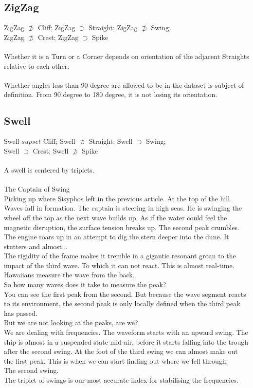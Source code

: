 \documentclass{report}
\begin{document}
\subsection{ZigZag}
ZigZag $\not\supset$ Cliff; ZigZag $\supset$ Straight; ZigZag $\not\supset$ Swing;\\ ZigZag $\not\supset$ Crest; ZigZag $\supset$ Spike\\\\
Whether it is a Turn or a Corner depends on orientation of the adjacent Straights relative to each other.\\\\
Whether angles less than 90 degree are allowed to be in the dataset is subject of definition.
From 90 degree to 180 degree, it is not losing its orientation.
\subsection{Swell}
Swell $supset$ Cliff; Swell $\not\supset$ Straight; Swell $\supset$ Swing;\\ Swell $\supset$ Crest; Swell $\not\supset$ Spike\\\\
A swell is centered by triplets.\\\\
The Captain of Swing\\
Picking up where Sisyphos left in the previous article. At the top of the hill. Waves fall in formation. The captain is steering in high seas. He is swinging the wheel off the top as the next wave builds up. As if the water could feel the magnetic disruption, the surface tension breaks up. The second peak crumbles. The engine roars up in an attempt to dig the stern deeper into the dune. It stutters and almost...\\
The rigidity of the frame makes it tremble in a gigantic resonant groan to the impact of the third wave. To which it can not react. This is almost real-time. Hawaiians measure the wave from the back.\\
So how many waves does it take to measure the peak?\\
You can see the first peak from the second. But because the wave segment reacts to its environment, the second peak is only locally defined when the third peak has passed.\\
But we are not looking at the peaks, are we?\\
We are dealing with frequencies. The waveform starts with an upward swing. The ship is almost in a suspended state mid-air, before it starts falling into the trough after the second swing. At the foot of the third swing we can almost make out the first peak. This is when we can start finding out where we fell through:\\
The second swing.\\
The triplet of swings is our most accurate index for stabilising the frequencies.
\end{document}
